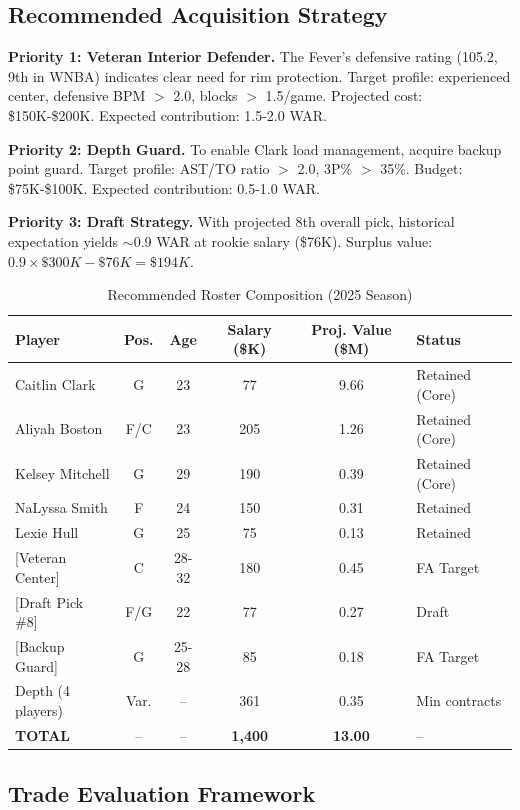 \documentclass{mcmthesis}
\begin{document}
\subsection{Recommended Acquisition Strategy}

\textbf{Priority 1: Veteran Interior Defender.} The Fever's defensive rating (105.2, 9th in WNBA) indicates clear need for rim protection. Target profile: experienced center, defensive BPM $>$ 2.0, blocks $>$ 1.5/game. Projected cost: \$150K-\$200K. Expected contribution: 1.5-2.0 WAR.

\textbf{Priority 2: Depth Guard.} To enable Clark load management, acquire backup point guard. Target profile: AST/TO ratio $>$ 2.0, 3P\% $>$ 35\%. Budget: \$75K-\$100K. Expected contribution: 0.5-1.0 WAR.

\textbf{Priority 3: Draft Strategy.} With projected 8th overall pick, historical expectation yields $\sim$0.9 WAR at rookie salary (\$76K). Surplus value: $0.9 \times \$300K - \$76K = \$194K$.

\begin{table}[H]
\centering
\caption{Recommended Roster Composition (2025 Season)}
\begin{tabular}{lccccl}
\toprule
\textbf{Player} & \textbf{Pos.} & \textbf{Age} & \textbf{Salary (\$K)} & \textbf{Proj. Value (\$M)} & \textbf{Status} \\
\midrule
Caitlin Clark & G & 23 & 77 & 9.66 & Retained (Core) \\
Aliyah Boston & F/C & 23 & 205 & 1.26 & Retained (Core) \\
Kelsey Mitchell & G & 29 & 190 & 0.39 & Retained (Core) \\
NaLyssa Smith & F & 24 & 150 & 0.31 & Retained \\
Lexie Hull & G & 25 & 75 & 0.13 & Retained \\
{[Veteran Center]} & C & 28-32 & 180 & 0.45 & FA Target \\
{[Draft Pick \#8]} & F/G & 22 & 77 & 0.27 & Draft \\
{[Backup Guard]} & G & 25-28 & 85 & 0.18 & FA Target \\
Depth (4 players) & Var. & -- & 361 & 0.35 & Min contracts \\
\midrule
\textbf{TOTAL} & -- & -- & \textbf{1,400} & \textbf{13.00} & -- \\
\bottomrule
\end{tabular}
\end{table}

\subsection{Trade Evaluation Framework}
\end{document}
